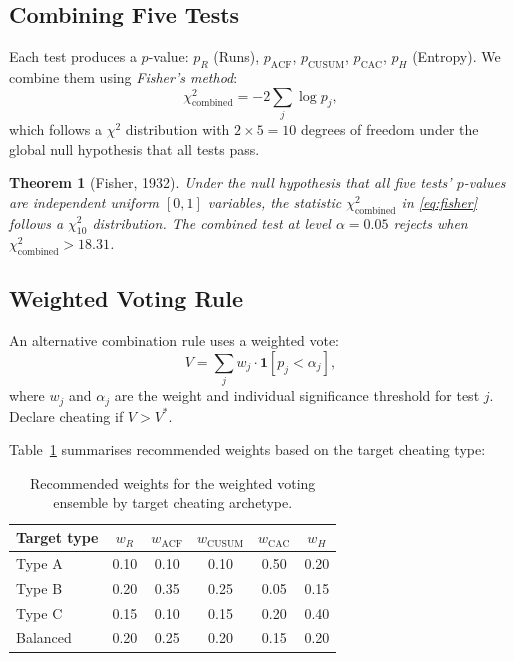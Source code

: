 \documentclass[11pt,a4paper]{article}
\newtheorem{theorem}{Theorem}
\begin{document}
\subsection{Combining Five Tests}

Each test produces a $p$-value: $p_R$ (Runs), $p_{\mathrm{ACF}}$,
$p_{\mathrm{CUSUM}}$, $p_{\mathrm{CAC}}$, $p_H$ (Entropy).
We combine them using \emph{Fisher's method}:
\begin{equation}
  \chi^2_{\mathrm{combined}} = -2 \sum_{j} \log p_j,
  \label{eq:fisher}
\end{equation}
which follows a $\chi^2$ distribution with $2 \times 5 = 10$ degrees
of freedom under the global null hypothesis that all tests pass.

\begin{theorem}[Fisher, 1932]
Under the null hypothesis that all five tests' $p$-values are independent
uniform $[0,1]$ variables, the statistic $\chi^2_{\mathrm{combined}}$
in \eqref{eq:fisher} follows a $\chi^2_{10}$ distribution.
The combined test at level $\alpha = 0.05$ rejects when
$\chi^2_{\mathrm{combined}} > 18.31$.
\end{theorem}

\subsection{Weighted Voting Rule}

An alternative combination rule uses a weighted vote:
\begin{equation}
  V = \sum_{j} w_j \cdot \mathbf{1}[p_j < \alpha_j],
\end{equation}
where $w_j$ and $\alpha_j$ are the weight and individual significance
threshold for test $j$. Declare cheating if $V > V^*$.

Table~\ref{tab:weights} summarises recommended weights based on the
target cheating type:

\begin{table}[h]
\centering
\begin{tabular}{lccccc}
\toprule
Target type & $w_R$ & $w_{\mathrm{ACF}}$ & $w_{\mathrm{CUSUM}}$ & $w_{\mathrm{CAC}}$ & $w_H$ \\
\midrule
Type A & 0.10 & 0.10 & 0.10 & 0.50 & 0.20 \\
Type B & 0.20 & 0.35 & 0.25 & 0.05 & 0.15 \\
Type C & 0.15 & 0.10 & 0.15 & 0.20 & 0.40 \\
Balanced & 0.20 & 0.25 & 0.20 & 0.15 & 0.20 \\
\bottomrule
\end{tabular}
\caption{Recommended weights for the weighted voting ensemble by target
cheating archetype.}
\label{tab:weights}
\end{table}
\end{document}
